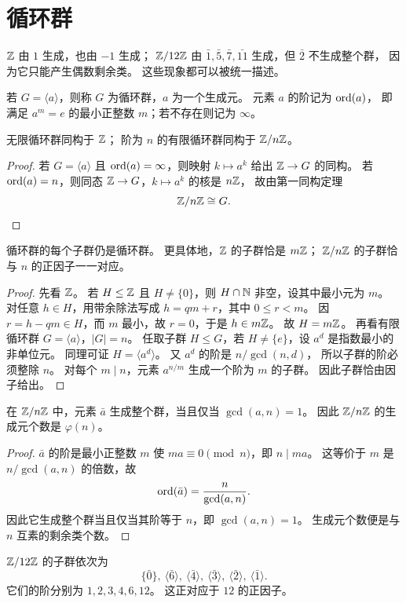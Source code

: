 \section{循环群}
\begin{example}
$\mathbb{Z}$ 由 $1$ 生成，也由 $-1$ 生成；
$\mathbb{Z}/12\mathbb{Z}$ 由 $\bar1,\bar5,\bar7,\bar{11}$ 生成，但 $\bar2$ 不生成整个群，
因为它只能产生偶数剩余类。
这些现象都可以被统一描述。
\end{example}
\begin{definition}
若 $G=\langle a\rangle$，则称 $G$ 为循环群，$a$ 为一个生成元。
元素 $a$ 的阶记为 $\mathrm{ord}(a)$，
即满足 $a^m=e$ 的最小正整数 $m$；若不存在则记为 $\infty$。
\end{definition}
\begin{proposition}
无限循环群同构于 $\mathbb{Z}$；
阶为 $n$ 的有限循环群同构于 $\mathbb{Z}/n\mathbb{Z}$。
\end{proposition}
\begin{proof}
若 $G=\langle a\rangle$ 且 $\mathrm{ord}(a)=\infty$，则映射 $k\mapsto a^k$ 给出 $\mathbb{Z}\to G$ 的同构。
若 $\mathrm{ord}(a)=n$，则同态 $\mathbb{Z}\to G$，$k\mapsto a^k$ 的核是 $n\mathbb{Z}$，
故由第一同构定理
\[ \mathbb{Z}/n\mathbb{Z}\cong G. \]
\end{proof}
\begin{theorem}[循环群的子群]
循环群的每个子群仍是循环群。
更具体地，$\mathbb{Z}$ 的子群恰是 $m\mathbb{Z}$；
$\mathbb{Z}/n\mathbb{Z}$ 的子群恰与 $n$ 的正因子一一对应。
\end{theorem}
\begin{proof}
先看 $\mathbb{Z}$。
若 $H\le \mathbb{Z}$ 且 $H\ne\{0\}$，则 $H\cap \mathbb{N}$ 非空，设其中最小元为 $m$。
对任意 $h\in H$，用带余除法写成 $h=qm+r$，其中 $0\le r<m$。
因 $r=h-qm\in H$，而 $m$ 最小，故 $r=0$，于是 $h\in m\mathbb{Z}$。
故 $H=m\mathbb{Z}$。
再看有限循环群 $G=\langle a\rangle$，$|G|=n$。
任取子群 $H\le G$，若 $H\ne\{e\}$，设 $a^d$ 是指数最小的非单位元。
同理可证 $H=\langle a^d\rangle$。
又 $a^d$ 的阶是 $n/\gcd(n,d)$，
所以子群的阶必须整除 $n$。
对每个 $m\mid n$，元素 $a^{n/m}$ 生成一个阶为 $m$ 的子群。
因此子群恰由因子给出。
\end{proof}
\begin{proposition}[生成元个数]
在 $\mathbb{Z}/n\mathbb{Z}$ 中，元素 $\bar a$ 生成整个群，当且仅当 $\gcd(a,n)=1$。
因此 $\mathbb{Z}/n\mathbb{Z}$ 的生成元个数是 $\varphi(n)$。
\end{proposition}
\begin{proof}
$\bar a$ 的阶是最小正整数 $m$ 使 $ma\equiv 0\pmod n$，即 $n\mid ma$。
这等价于 $m$ 是 $n/\gcd(a,n)$ 的倍数，故
\[ \mathrm{ord}(\bar a)=\frac{n}{\gcd(a,n)}. \]
因此它生成整个群当且仅当其阶等于 $n$，即 $\gcd(a,n)=1$。
生成元个数便是与 $n$ 互素的剩余类个数。
\end{proof}
\begin{example}[子群格的计算]
$\mathbb{Z}/12\mathbb{Z}$ 的子群依次为
\[ \{\bar0\},\ \langle \bar6\rangle,\ \langle \bar4\rangle,\ \langle \bar3\rangle,\ \langle \bar2\rangle,\ \langle \bar1\rangle. \]
它们的阶分别为 $1,2,3,4,6,12$。
这正对应于 $12$ 的正因子。
\end{example}
